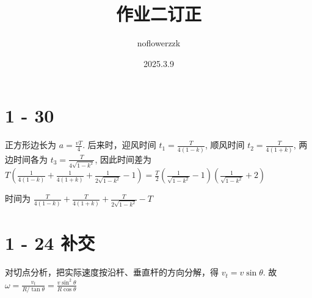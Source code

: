 \documentclass{article}
\title{作业二订正}
\author{noflowerzzk}
\date{2025.3.9}
\begin{document}
\maketitle

\section*{1 - 30}

正方形边长为 $a = \frac{vT}{4}$. 后来时，迎风时间 $t_1 = \frac{T}{4(1 - k)}$, 顺风时间 $t_2 = \frac{T}{4(1 + k)}$, 两边时间各为 $t_3 = \frac{T}{4\sqrt{1 - k^2}}$, 因此时间差为 $T\left(\frac{1}{4(1 - k)} + \frac{1}{4(1 + k)} + \frac{1}{2\sqrt{1 - k^2}} - 1\right) = \frac{T}{2}\left(\frac{1}{\sqrt{1 - k^2}} - 1\right)\left(\frac{1}{\sqrt{1 - k^2}} + 2\right)$

时间为 $\frac{T}{4(1 - k)} + \frac{T}{4(1 + k)} + \frac{T}{2\sqrt{1 - k^2}} - T$

\section*{1 - 24 补交}

对切点分析，把实际速度按沿杆、垂直杆的方向分解，得 $v_t = v\sin \theta$. 故 $\omega = \frac{v_t}{R/\tan \theta} = \frac{v \sin^2 \theta}{R\cos \theta}$
\end{document}
